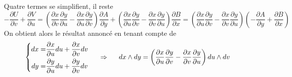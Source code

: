 \begin{demo}
\begin{enumerate}
Quatre termes se simplifient, il reste
\begin{displaymath}
 -\frac{\partial U}{\partial v}+\frac{\partial V}{\partial u}
=
\left(
\frac{\partial x}{\partial v}\frac{\partial y}{\partial u}
-
\frac{\partial x}{\partial u}\frac{\partial y}{\partial v}
 \right)\frac{\partial A}{\partial y}
+
\left(
\frac{\partial x}{\partial u}\frac{\partial y}{\partial v}
-
\frac{\partial x}{\partial v}\frac{\partial y}{\partial u}
 \right)\frac{\partial B}{\partial x} 
=
\left(
\frac{\partial x}{\partial u}\frac{\partial y}{\partial v}
-
\frac{\partial x}{\partial v}\frac{\partial y}{\partial u}
 \right)
\left(
-\frac{\partial A}{\partial y}+\frac{\partial B}{\partial x}
\right) 
\end{displaymath}
On obtient alors le résultat annoncé en tenant compte de
\begin{displaymath}
 \left\lbrace
\begin{aligned}
dx =& \frac{\partial x}{\partial u}du+\frac{\partial x}{\partial v}dv \\
dy =& \frac{\partial y}{\partial u}du+\frac{\partial y}{\partial v}dv 
\end{aligned}
 \right. 
\hspace{0.5cm}\Rightarrow \hspace{0.5cm}
dx\wedge dy = 
\left(
\frac{\partial x}{\partial u}\frac{\partial y}{\partial v}
-
\frac{\partial x}{\partial v}\frac{\partial y}{\partial u}
 \right)
du\wedge dv
\end{displaymath}
\end{enumerate}

\end{demo}


